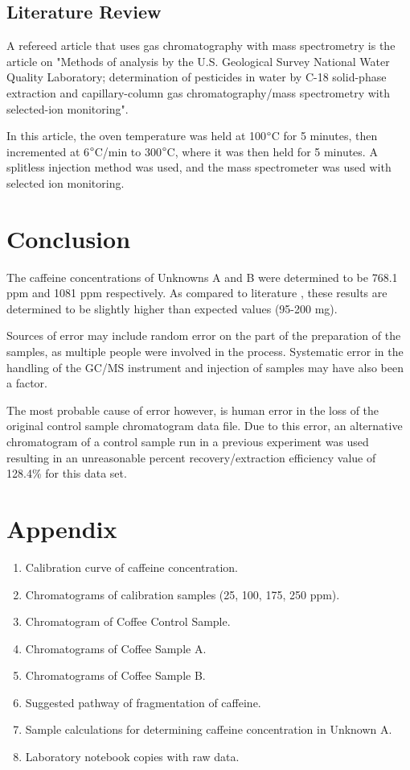 \documentclass{article}
\begin{document}
\begin{multicols}{2}
{\subsection*{Literature Review}
A refereed article that uses gas chromatography with mass spectrometry is the
article on "Methods of analysis by the U.S. Geological Survey National Water
Quality Laboratory; determination of pesticides in water by C-18 solid-phase
extraction and capillary-column gas chromatography/mass spectrometry with
selected-ion monitoring". \cite{article} 

In this article, the oven temperature was held at 100$\degree$C for 5 minutes,
then incremented at 6$\degree$C/min to 300$\degree$C, where it was then held for
5 minutes. A splitless injection method was used, and the mass spectrometer was
used with selected ion monitoring.


\section*{Conclusion}
The caffeine concentrations of Unknowns A and B were determined to be 768.1 ppm
and 1081 ppm respectively. As compared to literature \cite{mayo}, these
results are determined to be slightly higher than expected values (95-200 mg).

Sources of error may include random error on the part of the preparation of the
samples, as multiple people were involved in the process. Systematic error in
the handling of the GC/MS instrument and injection of samples may have also been
a factor.

The most probable cause of error however, is human error in the loss of the
original control sample chromatogram data file. Due to this error, an
alternative chromatogram of a control sample run in a previous experiment was
used resulting in an unreasonable percent recovery/extraction efficiency value
of 128.4\% for this data set.




}
\end{multicols}

\newpage
\section*{Appendix}
\begin{enumerate}
    \item Calibration curve of caffeine concentration.
    \item Chromatograms of calibration samples (25, 100, 175, 250 ppm).
    \item Chromatogram of Coffee Control Sample.
    \item Chromatograms of Coffee Sample A.
    \item Chromatograms of Coffee Sample B.
    \item Suggested pathway of fragmentation of caffeine.
    \item Sample calculations for determining caffeine concentration in Unknown
        A.
    \item Laboratory notebook copies with raw data.
\end{enumerate}
\end{document}

